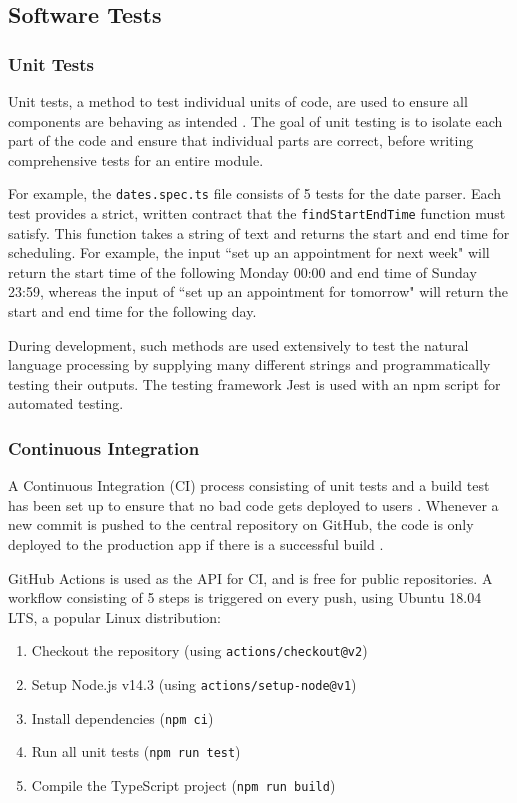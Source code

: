 \documentclass{article}
\begin{document}
\subsection{Software Tests}

\subsubsection{Unit Tests}

Unit tests, a method to test individual units of code, are used to ensure all components are behaving as intended \cite{tosun_effectiveness_2018}. The goal of unit testing is to isolate each part of the code and ensure that individual parts are correct, before writing comprehensive tests for an entire module.

For example, the \texttt{dates.spec.ts} file consists of 5 tests for the date parser. Each test provides a strict, written contract that the \texttt{findStartEndTime} function must satisfy. This function takes a string of text and returns the start and end time for scheduling. For example, the input ``set up an appointment for next week" will return the start time of the following Monday 00:00 and end time of Sunday 23:59, whereas the input of ``set up an appointment for tomorrow" will return the start and end time for the following day.

During development, such methods are used extensively to test the natural language processing by supplying many different strings and programmatically testing their outputs. The testing framework Jest is used with an npm script for automated testing.

\subsubsection{Continuous Integration}

A Continuous Integration (CI) process consisting of unit tests and a build test has been set up to ensure that no bad code gets deployed to users \cite{li_extensive_2020}. Whenever a new commit is pushed to the central repository on GitHub, the code is only deployed to the production app if there is a successful build \cite{noauthor_what_2019}.

GitHub Actions is used as the API for CI, and is free for public repositories. A workflow consisting of 5 steps is triggered on every push, using Ubuntu  18.04 LTS, a popular Linux distribution:

\begin{enumerate}
	\item Checkout the repository (using \texttt{actions/checkout@v2})
	\item Setup Node.js v14.3 (using \texttt{actions/setup-node@v1})
	\item Install dependencies (\texttt{npm ci})
	\item Run all unit tests (\texttt{npm run test})
	\item Compile the TypeScript project (\texttt{npm run build})
\end{enumerate}
\end{document}
